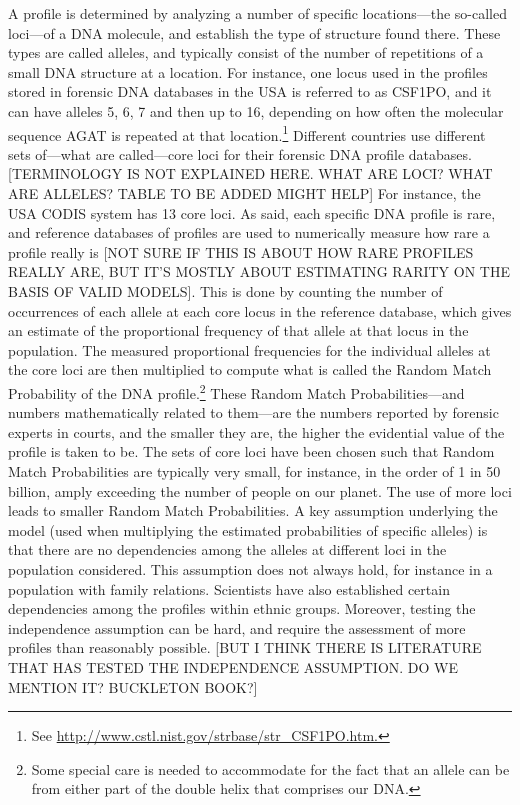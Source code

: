 \documentclass[10pt]{article}
\begin{document}
A profile is determined by analyzing a number of specific locations---the so-called loci---of a DNA molecule, and establish the type of structure found there. These types are called alleles, and typically consist of the number of repetitions of a small DNA structure at a location. For instance, one locus used in the profiles stored in forensic DNA databases in the USA is referred to as CSF1PO, and it can have alleles 5, 6, 7 and then up to 16, depending on how often the molecular sequence AGAT is repeated at that location.\footnote{See \url{http://www.cstl.nist.gov/strbase/str\_CSF1PO.htm.}} Different countries use different sets of---what are called---core loci for their forensic DNA profile databases. [TERMINOLOGY IS NOT EXPLAINED HERE. WHAT ARE LOCI? WHAT ARE ALLELES? TABLE TO BE ADDED MIGHT HELP] For instance, the USA CODIS system has 13 core loci. As said, each specific DNA profile is rare, and reference databases of profiles 
are used to numerically measure how rare a profile really is [NOT SURE IF THIS IS ABOUT HOW RARE PROFILES REALLY ARE, BUT IT'S MOSTLY 
ABOUT ESTIMATING RARITY ON THE BASIS OF VALID MODELS]. This is done by counting the number of occurrences of each allele at each core locus in the reference database, which gives an estimate of the proportional frequency of that allele at that locus in the population. The measured proportional frequencies for the individual alleles at the core loci are then multiplied to compute what is called the Random Match Probability of the DNA profile.\footnote{Some special care is needed to accommodate for the fact that an allele can be from either part of the double helix that comprises our DNA.} These Random Match Probabilities---and numbers mathematically related to them---are the numbers reported by forensic experts in courts, and the smaller they are, the higher the evidential value of the profile is taken to be. The sets of core loci have been chosen such that Random Match Probabilities are typically very small, for instance, in the order of 1 in 50 billion, amply exceeding the number of people on our planet. The use of more loci leads to smaller Random Match Probabilities. A key assumption underlying the model (used when multiplying the estimated probabilities of specific alleles) is that there are no dependencies among the alleles at different loci in the population considered. This assumption does not always hold, for instance in a population with family relations. Scientists have also established certain dependencies among the profiles within ethnic groups. Moreover, testing the independence assumption can be hard, and require the assessment of more profiles than reasonably possible. [BUT I THINK THERE IS LITERATURE THAT HAS TESTED THE INDEPENDENCE ASSUMPTION. DO WE MENTION IT? BUCKLETON BOOK?]
\end{document}
